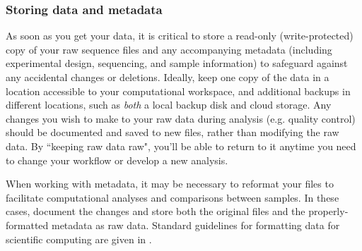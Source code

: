 \documentclass[10pt,letterpaper]{article}
\begin{document}


\subsubsection*{Storing data and metadata} %

As soon as you get your data, it is critical to store a read-only (write-protected) copy of your raw sequence files and any accompanying metadata (including experimental design, sequencing, and sample information) to safeguard against any accidental changes or deletions.
Ideally, keep one copy of the data in a location accessible to your computational workspace, and additional backups in different locations, such as \textit{both} a local backup disk and cloud storage.
Any changes you wish to make to your raw data during analysis (e.g. quality control) should be documented and saved to new files, rather than modifying the raw data. 
By ``keeping raw data raw", you'll be able to return to it anytime you need to change your workflow or develop a new analysis. 

When working with metadata, it may be necessary to reformat your files to facilitate computational analyses and comparisons between samples. In these cases, document the changes and store both the original files and the properly-formatted metadata as raw data. Standard guidelines for formatting data for scientific computing are given in \cite{wilson2017good}.

\end{document}
